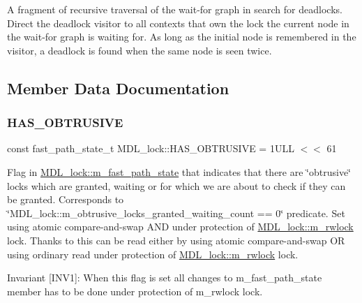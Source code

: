A fragment of recursive traversal of the wait-\/for graph in search for deadlocks. Direct the deadlock visitor to all contexts that own the lock the current node in the wait-\/for graph is waiting for. As long as the initial node is remembered in the visitor, a deadlock is found when the same node is seen twice. 

\subsection{Member Data Documentation}
\mbox{\label{classMDL__lock_ac0e55394e253bd9d0988c9a7ab243a39}} 
\subsubsection{\texorpdfstring{H\+A\+S\+\_\+\+O\+B\+T\+R\+U\+S\+I\+VE}{HAS\_OBTRUSIVE}}
{\footnotesize\ttfamily const fast\+\_\+path\+\_\+state\+\_\+t M\+D\+L\+\_\+lock\+::\+H\+A\+S\+\_\+\+O\+B\+T\+R\+U\+S\+I\+VE = 1\+U\+L\+L $<$$<$ 61\hspace{0.3cm}{\ttfamily [static]}}

Flag in \mbox{\hyperlink{classMDL__lock_ae680877b7079a862d294ccbefed6372c}{M\+D\+L\+\_\+lock\+::m\+\_\+fast\+\_\+path\+\_\+state}} that indicates that there are \char`\"{}obtrusive\char`\"{} locks which are granted, waiting or for which we are about to check if they can be granted. Corresponds to \char`\"{}\+M\+D\+L\+\_\+lock\+::m\+\_\+obtrusive\+\_\+locks\+\_\+granted\+\_\+waiting\+\_\+count == 0\char`\"{} predicate. Set using atomic compare-\/and-\/swap A\+ND under protection of \mbox{\hyperlink{classMDL__lock_a1308b4506d8cb6d754b4f173e3aa4962}{M\+D\+L\+\_\+lock\+::m\+\_\+rwlock}} lock. Thanks to this can be read either by using atomic compare-\/and-\/swap OR using ordinary read under protection of \mbox{\hyperlink{classMDL__lock_a1308b4506d8cb6d754b4f173e3aa4962}{M\+D\+L\+\_\+lock\+::m\+\_\+rwlock}} lock.

Invariant \mbox{[}I\+N\+V1\mbox{]}\+: When this flag is set all changes to m\+\_\+fast\+\_\+path\+\_\+state member has to be done under protection of m\+\_\+rwlock lock. \mbox{\label{classMDL__lock_ace80291dc2f7786288cdf1cec54bcb55}} 
